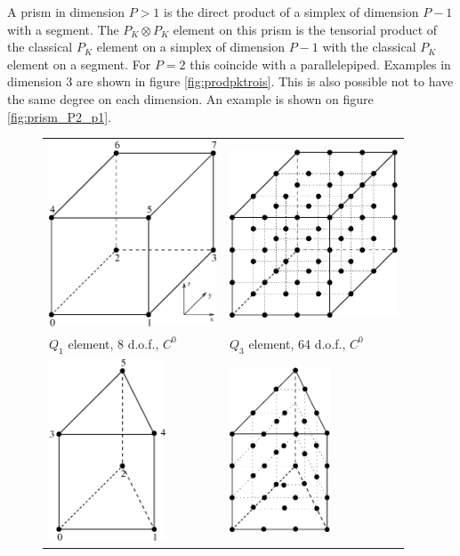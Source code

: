 \documentclass[10pt,a4paper]{article}
\begin{document}
A prism in dimension $P > 1$ is the direct product of a simplex of dimension $P-1$ with a segment. The $P_K \otimes P_K$ element on this prism is the tensorial product of the classical $P_K$ element on a simplex of dimension $P-1$ with the classical $P_K$ element on a segment. For $P=2$ this coincide with a parallelepiped. Examples in dimension $3$ are shown in figure \ref{fig:prodpktrois}. This is also possible not to have the same degree on each dimension. An example is shown on figure \ref{fig:prism_P2_p1}. 

\begin{figure}[H]
  \begin{center} \begin{tabular}{m{7cm}m{7cm}}
    \includegraphics[width=5cm,angle=0]{getfemlist_cube_Q1.eps} & \includegraphics[width=5cm,angle=0]{getfemlist_cube_Q3.eps} \\
    $Q_1$ element, 8 d.o.f., $C^0$ & $Q_3$ element, 64 d.o.f., $C^0$ \\
    \includegraphics[width=3.5cm,angle=0]{getfemlist_prism_P1.eps} & \includegraphics[width=3cm,angle=0]{getfemlist_prism_P3.eps} \\

\end{tabular}
\end{center}
\end{figure}
\end{document}
